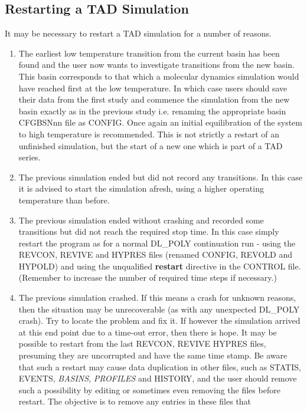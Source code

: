 \begin{enumerate}
\subsection{Restarting a TAD Simulation}
\label{tadrestart}
It may be necessary to restart a TAD simulation for a number of reasons.
\begin{enumerate}
\item The earliest low temperature transition
  from the current basin has been found and the user now wants to
  investigate transitions from the new basin. This basin corresponds
  to that which a molecular dynamics simulation would have reached
  first at the low temperature. In which case users should save their
  data from the first study and commence the simulation from the new
  basin exactly as in the previous study i.e. renaming the appropriate
  basin CFGBSNnn file as CONFIG. Once again an initial equilibration of the
  system to high temperature is recommended. This is not strictly a
  restart of an unfinished simulation, but the start of a new one
  which is part of a TAD series.
\item The previous simulation ended but did not record any transitions. 
  In this case it is advised to start the simulation afresh, using a
  higher operating temperature than before. 
\item The previous simulation ended without crashing and recorded 
  some transitions but did not reach the required stop time. In this
  case simply restart the program as for a normal DL\_POLY
  continuation run - using the REVCON, REVIVE and HYPRES files
  (renamed CONFIG, REVOLD and HYPOLD) and using the unqualified {\bf restart}
  directive in the CONTROL file. (Remember to increase the number of
  required time steps if necessary.)
\item The previous simulation crashed. If this means a crash for unknown
  reasons, then the situation may be unrecoverable (as with any
  unexpected DL\_POLY crash). Try to locate the problem and fix it. If
  however the simulation arrived at this end point due to a time-out
  error, then there is hope. It may be possible to restart from the
  last REVCON, REVIVE HYPRES files, presuming they are uncorrupted and
  have the same time stamp. Be aware that such a restart may cause
  data duplication in other files, such as STATIS, EVENTS, {\em
  BASINS}, {\em PROFILES} and HISTORY, and the user should remove such
  a possibility by editing or sometimes even removing the files before
  restart. The objective is to remove any entries in these files that

\end{enumerate}
\end{enumerate}
